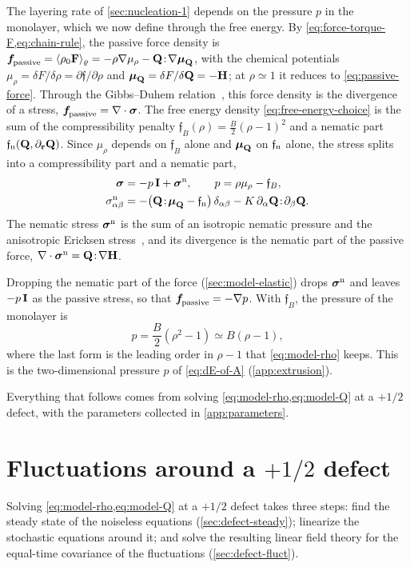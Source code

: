 \documentclass[aps,pre,reprint,superscriptaddress,longbibliography,nofootinbib
]{revtex4-2}
\begin{document}
The layering rate of \cref{sec:nucleation-1} depends on the
pressure $p$ in the monolayer, which we now define through
the free energy. By \cref{eq:force-torque-F,eq:chain-rule},
the passive force density is
$\boldsymbol{f}_\text{\!passive}=\langle\rho_0\mathbf{F}\rangle_\varrho
=-\rho\nabla\mu_\rho-\mathbf{Q}\!:\!\nabla\boldsymbol{\mu}_{\mathbf{Q}}$, with the
chemical potentials $\mu_\rho=\delta
F/\delta\rho=\partial\mathfrak f/\partial\rho$ and
$\boldsymbol{\mu}_{\mathbf{Q}}=\delta F/\delta\mathbf{Q}=-\mathbf{H}$; at $\rho\simeq1$ it
reduces to \cref{eq:passive-force}. Through the
Gibbs--Duhem relation~\cite{callen1985thermodynamics}, this
force density is the divergence of a stress,
$\boldsymbol{f}_\text{\!passive}=\nabla\cdot\boldsymbol\sigma$. The free energy density
\cref{eq:free-energy-choice} is the sum of the
compressibility penalty $\mathfrak f_B(\rho)=\tfrac
B2(\rho-1)^2$ and a nematic part $\mathfrak
f_{\rm n}(\mathbf{Q},\partial_{\mathbf{r}}\mathbf{Q})$. Since $\mu_\rho$ depends on
$\mathfrak f_B$ alone and $\boldsymbol{\mu}_{\mathbf{Q}}$ on $\mathfrak f_{\rm n}$
alone, the stress splits into a compressibility part and
a nematic part,
\begin{align}
  \boldsymbol\sigma &= -p\,\mathbf{I}+\boldsymbol\sigma^{\rm n},
  \qquad p=\rho\mu_\rho-\mathfrak f_B,
  \nonumber\\
  \sigma^{\rm n}_{\alpha\beta} &= -\bigl(\mathbf{Q}\!:\!\boldsymbol{\mu}_{\mathbf{Q}}-\mathfrak f_{\rm n}\bigr)\,\delta_{\alpha\beta}
  -K\,\partial_\alpha\mathbf{Q}\!:\!\partial_\beta\mathbf{Q} .
\end{align}
The nematic stress $\boldsymbol\sigma^{\rm n}$ is the sum of an isotropic
nematic pressure and the anisotropic Ericksen
stress~\cite{degennes1993physics,doostmohammadi2018active},
and its divergence is the nematic part of the passive
force, $\nabla\cdot\boldsymbol\sigma^{\rm n}=\mathbf{Q}\!:\!\nabla\mathbf{H}$.

Dropping the nematic part of the force
(\cref{sec:model-elastic}) drops $\boldsymbol\sigma^{\rm n}$ and leaves
$-p\,\mathbf{I}$ as the passive stress, so that $\boldsymbol{f}_\text{\!passive}=-\nabla p$.
With $\mathfrak f_B$, the pressure of the monolayer is
\begin{equation}
  \label{eq:pressure-definition}
  p=\frac B2\left(\rho^2-1\right)\simeq B(\rho-1),
\end{equation}
where the last form is the leading order in $\rho-1$ that
\cref{eq:model-rho} keeps. This is the two-dimensional
pressure $p$ of \cref{eq:dE-of-A} (\cref{app:extrusion}).

\bigskip
Everything that follows comes from solving
\cref{eq:model-rho,eq:model-Q} at a $+1/2$ defect, with the
parameters collected in \cref{app:parameters}.

\section{Fluctuations around a $+1/2$ defect}
\label{sec:defect}
Solving \cref{eq:model-rho,eq:model-Q} at a $+1/2$ defect
takes three steps: find the steady state of the noiseless
equations (\cref{sec:defect-steady}); linearize the
stochastic equations around it; and solve the resulting
linear field theory for the equal-time covariance of the
fluctuations (\cref{sec:defect-fluct}).
\end{document}
